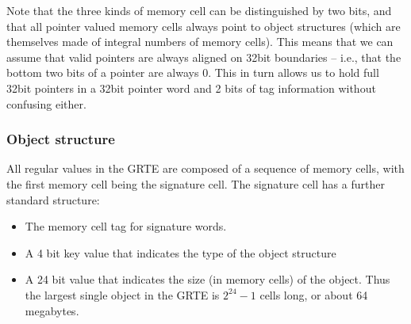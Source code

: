 Note that the three kinds of memory cell can be distinguished by two bits, and that all pointer valued memory cells always point to object structures (which are themselves made of integral numbers of memory cells). This means that we can assume that valid pointers are always aligned on 32bit boundaries -- i.e., that the bottom two bits of a pointer are always 0. This in turn allows us to hold full 32bit pointers in a 32bit pointer word and 2 bits of tag information without confusing either.

\subsubsection{Object structure}
\label{howitworks:object}

All regular values in the GRTE are composed of a sequence of memory cells, with the first memory cell being the signature cell. The signature cell has a further standard structure:

\begin{itemize}
\item
The memory cell tag for signature words.
\item
A 4 bit key value that indicates the type of the object structure
\item
A 24 bit value that indicates the size (in memory cells) of the object. Thus the largest single object in the GRTE is $2^24-1$ cells long, or about 64 megabytes.
\end{itemize}


